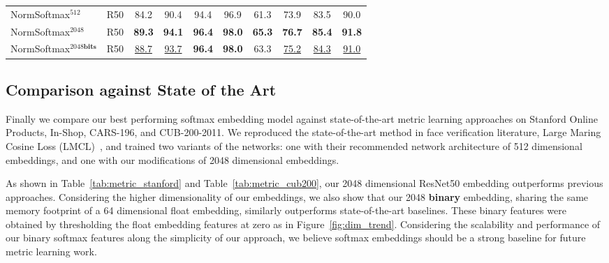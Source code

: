 \documentclass{bmvc2k}
\begin{document}
\begin{table*}
\begin{center}
{\begin{tabular}{l | c | c c c c | c c c c }
NormSoftmax$^{512}$  & R50 & 84.2 & 90.4 & 94.4 & 96.9  & 61.3 & 73.9 & 83.5 & 90.0 \\
NormSoftmax$^{2048}$ & R50 & \textbf{89.3} & \textbf{94.1} & \textbf{96.4} & \textbf{98.0} & \textbf{65.3} & \textbf{76.7} & \textbf{85.4} & \textbf{91.8} \\
NormSoftmax$^{2048\textbf{bits}}$ & R50 & \underline{88.7} & \underline{93.7} & \textbf{96.4} & \textbf{98.0} & 63.3 & \underline{75.2} & \underline{84.3} & \underline{91.0} \\ 
\hline
\end{tabular}
}
\end{center}
\caption{Recall@K on CARS-196 and CUB-200-2011. R - ResNet, G - GoogleNet, B - BNInception, $\dagger$ refers to additional attention parameters, LMCL$^\ast$ is our method trained with the Loss}
\label{tab:metric_cub200}
\end{table*}

\subsection{Comparison against State of the Art}
\label{sec:exp_soa}

Finally we compare our best performing softmax embedding model against state-of-the-art metric learning approaches on Stanford Online Products, In-Shop, CARS-196, and CUB-200-2011. We reproduced the state-of-the-art method in face verification literature, Large Maring Cosine Loss (LMCL)~\cite{Wang2018CosFaceLM}, and trained two variants of the networks: one with their recommended network architecture of 512 dimensional embeddings, and one with our modifications of 2048 dimensional embeddings. 



As shown in Table~\ref{tab:metric_stanford} and Table~\ref{tab:metric_cub200}, our 2048 dimensional ResNet50 embedding outperforms previous approaches. Considering the higher dimensionality of our embeddings, we also show that our 2048 \textbf{binary} embedding, sharing the same memory footprint of a 64 dimensional float embedding, similarly outperforms state-of-the-art baselines. These binary features were obtained by thresholding the float embedding features at zero as in Figure~\ref{fig:dim_trend}. Considering the scalability and performance of our binary softmax features along the simplicity of our approach, we believe softmax embeddings should be a strong baseline for future metric learning work.

 
\end{document}
